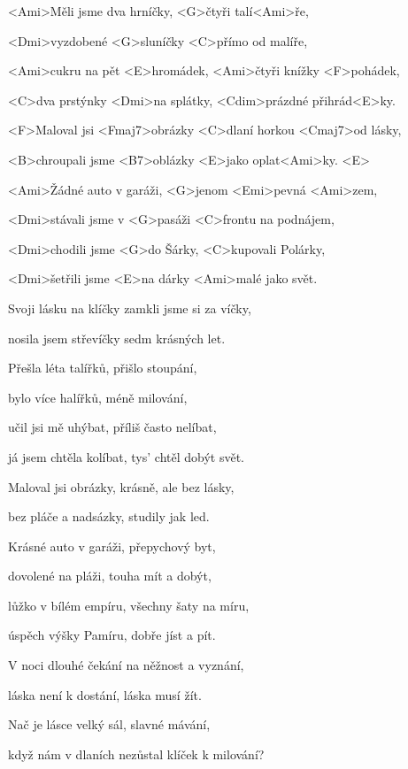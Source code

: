 

\zs
<Ami>Měli jsme dva hrníčky, <G>čtyři talí<Ami>ře,

<Dmi>vyzdobené <G>sluníčky <C>přímo od malíře,

<Ami>cukru na pět <E>hromádek, <Ami>čtyři knížky <F>pohádek,

<C>dva prstýnky <Dmi>na splátky, <Cdim>prázdné přihrád<E>ky.

\bigskip

<F>Maloval jsi <Fmaj7>obrázky <C>dlaní horkou <Cmaj7>od lásky,

<B>chroupali jsme <B7>oblázky <E>jako oplat<Ami>ky. <E>
\ks

\zr
<Ami>Žádné auto v garáži, <G>jenom <Emi>pevná <Ami>zem,

<Dmi>stávali jsme v <G>pasáži <C>frontu na podnájem,

<Dmi>chodili jsme <G>do Šárky, <C>kupovali Polárky,

<Dmi>šetřili jsme <E>na dárky <Ami>malé jako svět.

\bigskip

Svoji lásku na klíčky zamkli jsme si za víčky,

nosila jsem střevíčky sedm krásných let.
\kr

\zs
Přešla léta talířků, přišlo stoupání,

bylo více halířků, méně milování,

učil jsi mě uhýbat, příliš často nelíbat,

já jsem chtěla kolíbat, tys' chtěl dobýt svět.

\bigskip

Maloval jsi obrázky, krásně, ale bez lásky,

bez pláče a nadsázky, studily jak led.
\ks

\zr
Krásné auto v garáži, přepychový byt,

dovolené na pláži, touha mít a dobýt,

lůžko v bílém empíru, všechny šaty na míru,

úspěch výšky Pamíru, dobře jíst a pít.

\bigskip

V noci dlouhé čekání na něžnost a vyznání,

láska není k dostání, láska musí žít.
\kr

\zs
Nač je lásce velký sál, slavné mávání,

když nám v dlaních nezůstal klíček k milování?

